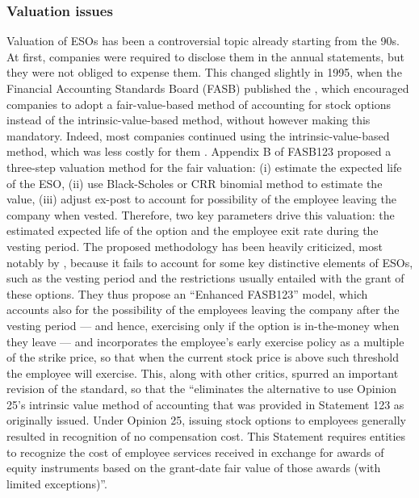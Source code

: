 \subsubsection{Valuation issues}
    Valuation of ESOs has been a controversial topic already starting from the 90s. At first, companies were required to disclose them in the annual statements, but they were not obliged to expense them. This changed slightly in 1995, when the Financial Accounting Standards Board (FASB) published the \citet{fasb123}, which encouraged companies to adopt a fair-value-based method of accounting for stock options instead of the intrinsic-value-based method, without however making this mandatory. Indeed, most companies continued using the intrinsic-value-based method, which was less costly for them \citep{hull2004value}. 
    Appendix B of FASB123 proposed a three-step valuation method for the fair valuation: (i) estimate the expected life of the ESO, (ii) use Black-Scholes or CRR binomial method to estimate the value, (iii) adjust ex-post to account for possibility of the employee leaving the company when vested. Therefore, two key parameters drive this valuation: the estimated expected life of the option and the employee exit rate during the vesting period. The proposed methodology has been heavily criticized, most notably by \citet{hull2004value}, because it fails to account for some key distinctive elements of ESOs, such as the vesting period and the restrictions usually entailed with the grant of these options. They thus propose an ``Enhanced FASB123'' model, which accounts also for the possibility of the employees leaving the company after the vesting period --- and hence, exercising only if the option is in-the-money when they leave --- and incorporates the employee's early exercise policy as a multiple of the strike price, so that when the current stock price is above such threshold the employee will exercise. 
    This, along with other critics, spurred an important revision of the standard, so that the \citet{fasb123_revised} ``eliminates the alternative to use Opinion 25’s intrinsic value method of accounting that was provided in Statement 123 as originally issued. Under Opinion 25, issuing stock options to employees generally resulted in recognition of no compensation cost. This Statement requires entities to recognize the cost of employee services received in exchange for awards of equity instruments based on the grant-date fair value of those awards (with limited exceptions)''.
